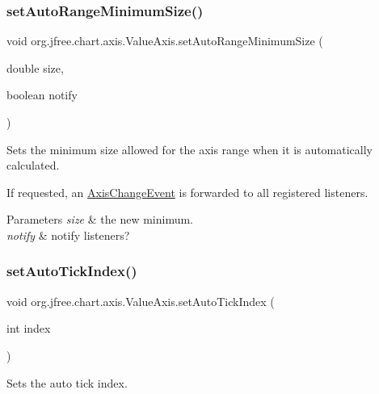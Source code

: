\subsubsection{\texorpdfstring{set\+Auto\+Range\+Minimum\+Size()}{setAutoRangeMinimumSize()}\hspace{0.1cm}{\footnotesize\ttfamily [2/2]}}
{\footnotesize\ttfamily void org.\+jfree.\+chart.\+axis.\+Value\+Axis.\+set\+Auto\+Range\+Minimum\+Size (\begin{DoxyParamCaption}\item[{double}]{size,  }\item[{boolean}]{notify }\end{DoxyParamCaption})}

Sets the minimum size allowed for the axis range when it is automatically calculated. 

If requested, an \mbox{\hyperlink{}{Axis\+Change\+Event}} is forwarded to all registered listeners.


\begin{DoxyParams}{Parameters}
{\em size} & the new minimum. \\
\hline
{\em notify} & notify listeners? \\
\hline
\end{DoxyParams}
\mbox{\label{classorg_1_1jfree_1_1chart_1_1axis_1_1_value_axis_af2dcbd83d70a20e207492f3b8b02d9d1}} 
\subsubsection{\texorpdfstring{set\+Auto\+Tick\+Index()}{setAutoTickIndex()}}
{\footnotesize\ttfamily void org.\+jfree.\+chart.\+axis.\+Value\+Axis.\+set\+Auto\+Tick\+Index (\begin{DoxyParamCaption}\item[{int}]{index }\end{DoxyParamCaption})\hspace{0.3cm}{\ttfamily [protected]}}

Sets the auto tick index.


